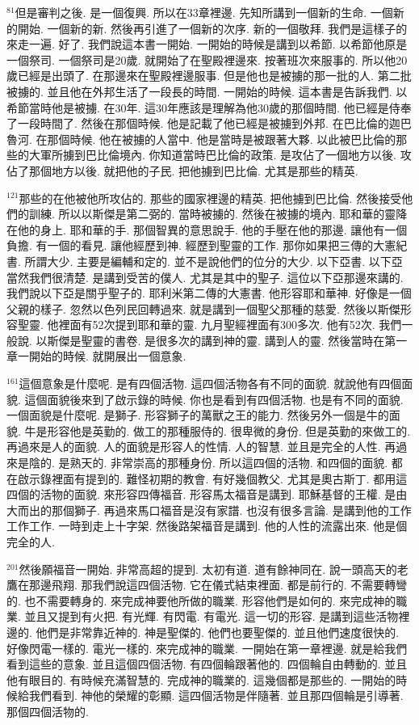 \documentclass{book}
\begin{document}
$^{81}$但是審判之後.
是一個復興.
所以在33章裡邊.
先知所講到一個新的生命.
一個新的開始.
一個新的新.
然後再引進了一個新的次序.
新的一個敬拜.
我們是這樣子的來走一遍.
好了.
我們說這本書一開始.
一開始的時候是講到以希節.
以希節他原是一個祭司.
一個祭司是20歲.
就開始了在聖殿裡邊來.
按著班次來服事的.
所以他20歲已經是出頭了.
在那邊來在聖殿裡邊服事.
但是他也是被擄的那一批的人.
第二批被擄的.
並且他在外邦生活了一段長的時間.
一開始的時候.
這本書是告訴我們.
以希節當時他是被擄.
在30年.
這30年應該是理解為他30歲的那個時間.
他已經是侍奉了一段時間了.
然後在那個時候.
他是記載了他已經是被擄到外邦.
在巴比倫的迦巴魯河.
在那個時候.
他在被擄的人當中.
他是當時是被跟著大夥.
以此被巴比倫的那些的大軍所擄到巴比倫境內.
你知道當時巴比倫的政策.
是攻佔了一個地方以後.
攻佔了那個地方以後.
就把他的子民.
把他擄到巴比倫.
尤其是那些的精英.

$^{121}$那些的在他被他所攻佔的.
那些的國家裡邊的精英.
把他擄到巴比倫.
然後接受他們的訓練.
所以以斯傑是第二弼的.
當時被擄的.
然後在被擄的境內.
耶和華的靈降在他的身上.
耶和華的手.
那個智異的意思說手.
他的手壓在他的那邊.
讓他有一個負擔.
有一個的看見.
讓他經歷到神.
經歷到聖靈的工作.
那你如果把三傳的大憲紀書.
所謂大少.
主要是編輔和定的.
並不是說他們的位分的大少.
以下亞書.
以下亞當然我們很清楚.
是講到受苦的僕人.
尤其是其中的聖子.
這位以下亞那邊來講的.
我們說以下亞是關乎聖子的.
耶利米第二傳的大憲書.
他形容耶和華神.
好像是一個父親的樣子.
忽然以色列民回轉過來.
就是講到一個聖父那種的慈愛.
然後以斯傑形容聖靈.
他裡面有52次提到耶和華的靈.
九月聖經裡面有300多次.
他有52次.
我們一般說.
以斯傑是聖靈的書卷.
是很多次的講到神的靈.
講到人的靈.
然後當時在第一章一開始的時候.
就開展出一個意象.

$^{161}$這個意象是什麼呢.
是有四個活物.
這四個活物各有不同的面貌.
就說他有四個面貌.
這個面貌後來到了啟示錄的時候.
你也是看到有四個活物.
也是有不同的面貌.
一個面貌是什麼呢.
是獅子.
形容獅子的萬獸之王的能力.
然後另外一個是牛的面貌.
牛是形容他是英勤的.
做工的那種服侍的.
很卑微的身份.
但是英勤的來做工的.
再過來是人的面貌.
人的面貌是形容人的性情.
人的智慧.
並且是完全的人性.
再過來是陰的.
是熟天的.
非常崇高的那種身份.
所以這四個的活物.
和四個的面貌.
都在啟示錄裡面有提到的.
難怪初期的教會.
有好幾個教父.
尤其是奧古斯丁.
都用這四個的活物的面貌.
來形容四傳福音.
形容馬太福音是講到.
耶穌基督的王權.
是由大而出的那個獅子.
再過來馬口福音是沒有家譜.
也沒有很多言論.
是講到他的工作工作工作.
一時到走上十字架.
然後路架福音是講到.
他的人性的流露出來.
他是個完全的人.

$^{201}$然後願福音一開始.
非常高超的提到.
太初有道.
道有餘神同在.
說一頭高天的老鷹在那邊飛翔.
那我們說這四個活物.
它在儀式結束裡面.
都是前行的.
不需要轉彎的.
也不需要轉身的.
來完成神要他所做的職業.
形容他們是如何的.
來完成神的職業.
並且又提到有火把.
有光輝.
有閃電.
有電光.
這一切的形容.
是講到這些活物裡邊的.
他們是非常靠近神的.
神是聖傑的.
他們也要聖傑的.
並且他們速度很快的.
好像閃電一樣的.
電光一樣的.
來完成神的職業.
一開始在第一章裡邊.
就是給我們看到這些的意象.
並且這個四個活物.
有四個輪跟著他的.
四個輪自由轉動的.
並且他有眼目的.
有時候充滿智慧的.
完成神的職業的.
這幾個都是那些的.
一開始的時候給我們看到.
神他的榮耀的彰顯.
這四個活物是伴隨著.
並且那四個輪是引導著.
那個四個活物的.
\end{document}
